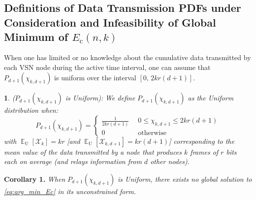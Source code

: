 \documentclass[twocolumn,english]{IEEEtran}
\theoremstyle{plain}
\theoremstyle{definition}
\newtheorem{defn}[thm]{\protect\definitionname}
\newcommand{\E}{\mathop{\mathbb E}}
\providecommand{\definitionname}{Definition}
\providecommand{\definitionname}{Definition}
\begin{document}
\subsection{Definitions of Data Transmission PDFs under Consideration and Infeasibility
of Global Minimum of $E_{\text{c}}\left(n,k\right)$ }

When one has limited or no knowledge about the cumulative data transmitted
by each VSN node during the active time interval, one can assume that
$P_{d+1}(\chi_{k,d+1})$ is uniform over the interval $[0,\,2kr\left(d+1\right)]$. 
\begin{defn}
\emph{($P_{d+1}(\chi_{k,d+1})$ is Uniform):} \emph{We define $P_{d+1}(\chi_{k,d+1})$
as the Uniform distribution when:} 
\begin{equation}
P_{d+1}(\chi_{k,d+1})=\begin{cases}
\frac{1}{2kr\left(d+1\right)} & \,\,\,0\le\chi_{k,d+1}\le2kr\left(d+1\right)\\
0 & \,\,\,\text{otherwise}
\end{cases}\label{eq:uniform}
\end{equation}
\emph{with }$\E_{\text{U}}[\mathcal{X}_{k}]=kr$ \emph{{[}and }$\E_{\text{U}}[\mathcal{X}_{k,d+1}]=kr\left(d+1\right)$\emph{{]}
corresponding to the mean value of the data transmitted by a node
that produces $k$ frames of $r$ bits each on average (and relays
information from $d$ other nodes).} 
\end{defn}
\textbf{Corollary 1.}\emph{ When }$P_{d+1}(\chi_{k,d+1})$ \emph{is
Uniform, there exists no global solution to \eqref{eq:arg_min_Ec}
in its unconstrained form.} 
\end{document}
